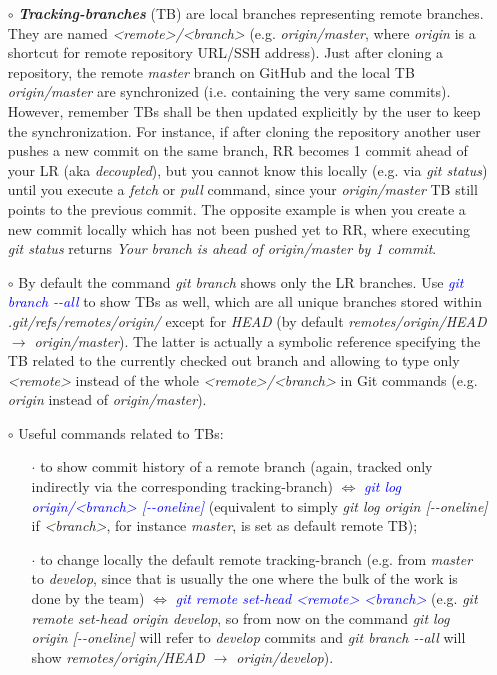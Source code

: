 \documentclass[a4paper,portrait,10pt]{article}   %
\newcommand{\mybulletlvA}{$\circ$}   %
\newcommand{\mybulletlvB}{$\cdot$}   %
\newcommand{\mydiv}{$\Leftrightarrow$ }   %
\newcommand{\mycmd}[1]{\textcolor{blue}{\textit{#1}}}   %
\newcommand{\myparvspace}{\vspace{4mm}}   %
\begin{document}
\begin{itemize}
\item[\mybulletlvA] \textbf{\textit{Tracking-branches}} (TB) are local branches representing remote branches. They are named \textit{<remote>/<branch>} (e.g. \textit{origin/master}, where \textit{origin} is a shortcut for remote repository URL/SSH address). Just after cloning a repository, the remote \textit{master} branch on GitHub and the local TB \textit{origin/master} are synchronized (i.e. containing the very same commits). However, remember TBs shall be then updated explicitly by the user to keep the synchronization. For instance, if after cloning the repository another user pushes a new commit on the same branch, RR becomes 1 commit ahead of your LR (aka \textit{decoupled}), but you cannot know this locally (e.g. via \textit{git status}) until you execute a \textit{fetch} or \textit{pull} command, since your \textit{origin/master} TB still points to the previous commit. The opposite example is when you create a new commit locally which has not been pushed yet to RR, where executing \textit{git status} returns \textit{Your branch is ahead of origin/master by 1 commit}.
\myparvspace

\item[\mybulletlvA] By default the command \textit{git branch} shows only the LR branches. Use \mycmd{git branch -{}-all} to show TBs as well, which are all unique branches stored within \textit{.git/refs/remotes/origin/} except for \textit{HEAD} (by default \textit{remotes/origin/HEAD $\rightarrow$ origin/master}). The latter is actually a symbolic reference specifying the TB related to the currently checked out branch and allowing to type only \textit{<remote>} instead of the whole \textit{<remote>/<branch>} in Git commands (e.g. \textit{origin} instead of \textit{origin/master}).
\myparvspace

\item[\mybulletlvA] Useful commands related to TBs:
\begin{itemize}
  \item[\mybulletlvB] to show commit history of a remote branch (again, tracked only indirectly via the corresponding tracking-branch) \mydiv \mycmd{git log origin/<branch> [-{}-oneline]} (equivalent to simply \textit{git log origin [-{}-oneline]} if \textit{<branch>}, for instance \textit{master}, is set as default remote TB);
  \item[\mybulletlvB] to change locally the default remote tracking-branch (e.g. from \textit{master} to \textit{develop}, since that is usually the one where the bulk of the work is done by the team) \mydiv \mycmd{git remote set-head <remote> <branch>} (e.g. \textit{git remote set-head origin develop}, so from now on the command \textit{git log origin [-{}-oneline]} will refer to \textit{develop} commits and \textit{git branch -{}-all} will show \textit{remotes/origin/HEAD $\rightarrow$ origin/develop}).
\end{itemize}
\myparvspace


\end{itemize}
\end{document}
